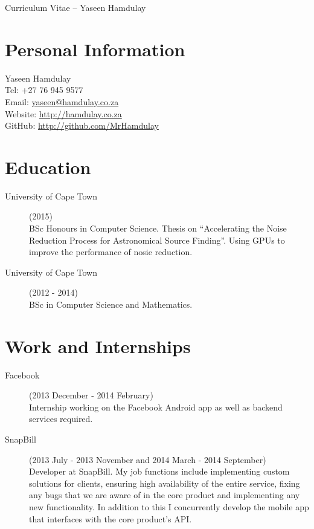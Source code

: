 \documentclass[margin,line,a4paper]{resume}
\begin{document}
    {\sc \Large Curriculum Vitae -- Yaseen Hamdulay}
    \begin{resume}
        \vspace{0.5cm}

        \section{\mysidestyle Personal Information}
            Yaseen Hamdulay\\
            Tel: +27 76 945 9577\\
            Email: \href{mailto:yaseen@hamdulay.co.za}{yaseen@hamdulay.co.za}\\
            Website: \href{http://hamdulay.co.za}{http://hamdulay.co.za}\\
            GitHub: \href{http://github.com/MrHamdulay}{http://github.com/MrHamdulay}\\

        \section{\mysidestyle Education}
            \begin{description}
                \item[University of Cape Town] (2015) \\
                    BSc Honours in Computer Science. Thesis on ``Accelerating the Noise Reduction Process for Astronomical Source Finding''.
                    Using GPUs to improve the performance of nosie reduction.

                \item[University of Cape Town] (2012 - 2014) \\
                    BSc in Computer Science and Mathematics.
            \end{description}


        \section{\mysidestyle Work and Internships}
            \begin{description}
                \item[Facebook] (2013 December - 2014 February) \\
                    Internship working on the Facebook Android app as well as backend services required.

                \item[SnapBill] (2013 July - 2013 November and 2014 March - 2014 September) \\
                    Developer at SnapBill. My job functions include implementing custom solutions for clients,
                    ensuring high availability of the entire service, fixing any bugs that we are aware of in the
                    core product and implementing any new functionality. In addition to this I concurrently develop
                    the mobile app that interfaces with the core product's API.


\end{description}
\end{resume}
\end{document}
